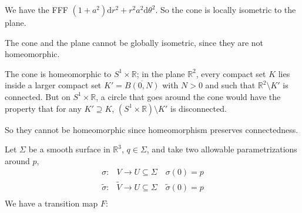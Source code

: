 \begin{example}
\begin{enumerate}
        We have the FFF \((1 + a^2)\mathrm{d}r^2 + r^{2}a^2\mathrm{d}\theta^2\). So the cone is locally isometric to the plane.
        \begin{note}
            The cone and the plane cannot be globally isometric, since they are not homeomorphic.

            The cone is homeomorphic to \(S^1 \times \mathbb{R}\); in the plane \(\mathbb{R}^2\), every compact set \(K\) lies inside a larger compact set \(K' = \overline{B(0,N)}\) with \(N > 0\) and such that \(\mathbb{R}^2 \setminus K'\) is connected. But on \(S^1 \times \mathbb{R}\), a circle that goes around the cone would have the property that for any \(K' \supseteq K\), \((S^1 \times \mathbb{R})\setminus K'\) is disconnected.

            So they cannot be homeomorphic since homeomorphism preserves connectedness.
        \end{note}
    \end{enumerate}
\end{example}
Let \(\Sigma\) be a smooth surface in \(\mathbb{R}^3\), \(q \in \Sigma\), and take two allowable parametrizations around \(p\),
\begin{align*}
    \sigma:& V \to U \subseteq \Sigma \quad \sigma(0) = p\\
    \tilde{\sigma}:& \tilde{V} \to U \subseteq \Sigma \quad \tilde{\sigma}(0) = p\\
\end{align*}
We have a transition map \(F: \) 